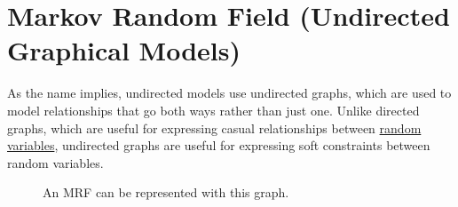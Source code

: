 \documentclass{article}
\begin{document}
\section{Markov Random Field (Undirected Graphical Models)}

  As the name implies, undirected models use undirected graphs, which are used to model relationships that go both ways rather than just one. Unlike directed graphs, which are useful for expressing casual relationships between \hyperref[prob-def:random-variable]{random variables}, undirected graphs are useful for expressing soft constraints between random variables.  

  \begin{figure}[H]
    \centering 
    \caption{An MRF can be represented with this graph.} 
    \label{fig:mrf_graph}
  \end{figure}
\end{document}
